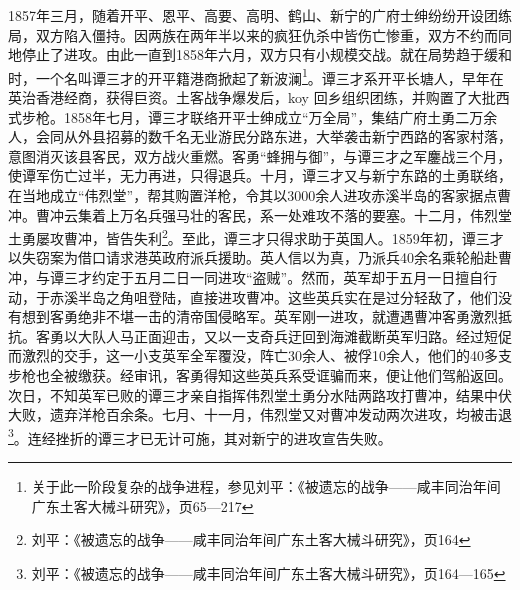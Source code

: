 1857年三月，随着开平、恩平、高要、高明、鹤山、新宁的广府士绅纷纷开设团练局，双方陷入僵持。因两族在两年半以来的疯狂仇杀中皆伤亡惨重，双方不约而同地停止了进攻。由此一直到1858年六月，双方只有小规模交战。就在局势趋于缓和时，一个名叫谭三才的开平籍港商掀起了新波澜\footnote{关于此一阶段复杂的战争进程，参见刘平：《被遗忘的战争——咸丰同治年间广东土客大械斗研究》，页65—217}。谭三才系开平长塘人，早年在英治香港经商，获得巨资。土客战争爆发后，koy 回乡组织团练，并购置了大批西式步枪。1858年七月，谭三才联络开平士绅成立“万全局”，集结广府土勇二万余人，会同从外县招募的数千名无业游民分路东进，大举袭击新宁西路的客家村落，意图消灭该县客民，双方战火重燃。客勇“蜂拥与御”，与谭三才之军鏖战三个月，使谭军伤亡过半，无力再进，只得退兵。十月，谭三才又与新宁东路的土勇联络，在当地成立“伟烈堂”，帮其购置洋枪，令其以3000余人进攻赤溪半岛的客家据点曹冲。曹冲云集着上万名兵强马壮的客民，系一处难攻不落的要塞。十二月，伟烈堂土勇屡攻曹冲，皆告失利\footnote{刘平：《被遗忘的战争——咸丰同治年间广东土客大械斗研究》，页164}。至此，谭三才只得求助于英国人。1859年初，谭三才以失窃案为借口请求港英政府派兵援助。英人信以为真，乃派兵40余名乘轮船赴曹冲，与谭三才约定于五月二日一同进攻“盗贼”。然而，英军却于五月一日擅自行动，于赤溪半岛之角咀登陆，直接进攻曹冲。这些英兵实在是过分轻敌了，他们没有想到客勇绝非不堪一击的清帝国侵略军。英军刚一进攻，就遭遇曹冲客勇激烈抵抗。客勇以大队人马正面迎击，又以一支奇兵迂回到海滩截断英军归路。经过短促而激烈的交手，这一小支英军全军覆没，阵亡30余人、被俘10余人，他们的40多支步枪也全被缴获。经审讯，客勇得知这些英兵系受诓骗而来，便让他们驾船返回。次日，不知英军已败的谭三才亲自指挥伟烈堂土勇分水陆两路攻打曹冲，结果中伏大败，遗弃洋枪百余条。七月、十一月，伟烈堂又对曹冲发动两次进攻，均被击退\footnote{刘平：《被遗忘的战争——咸丰同治年间广东土客大械斗研究》，页164—165}。连经挫折的谭三才已无计可施，其对新宁的进攻宣告失败。

